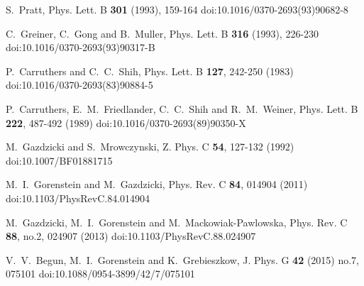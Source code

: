 \begin{thebibliography}{99}
S.~Pratt,
Phys. Lett. B \textbf{301} (1993), 159-164
doi:10.1016/0370-2693(93)90682-8

C.~Greiner, C.~Gong and B.~Muller,
Phys. Lett. B \textbf{316} (1993), 226-230
doi:10.1016/0370-2693(93)90317-B

P.~Carruthers and C.~C.~Shih,
Phys. Lett. B \textbf{127}, 242-250 (1983)
doi:10.1016/0370-2693(83)90884-5

P.~Carruthers, E.~M.~Friedlander, C.~C.~Shih and R.~M.~Weiner,
Phys. Lett. B \textbf{222}, 487-492 (1989)
doi:10.1016/0370-2693(89)90350-X

M.~Gazdzicki and S.~Mrowczynski,
Z. Phys. C \textbf{54}, 127-132 (1992)
doi:10.1007/BF01881715

M.~I.~Gorenstein and M.~Gazdzicki,
Phys. Rev. C \textbf{84}, 014904 (2011)
doi:10.1103/PhysRevC.84.014904

M.~Gazdzicki, M.~I.~Gorenstein and M.~Mackowiak-Pawlowska,
Phys. Rev. C \textbf{88}, no.2, 024907 (2013)
doi:10.1103/PhysRevC.88.024907


V.~V.~Begun, M.~I.~Gorenstein and K.~Grebieszkow,
J. Phys. G \textbf{42} (2015) no.7, 075101
doi:10.1088/0954-3899/42/7/075101


\end{thebibliography}
